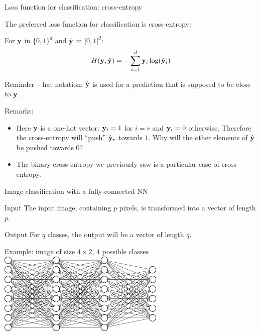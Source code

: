 \documentclass[xcolor=pdftex,dvipsnames,table,mathserif]{beamer}
\begin{document}
\begin{frame}{Loss function for classification: cross-entropy}

  The preferred loss function for classification is cross-entropy:

  \begin{block}{}
    For $\mathbf{y}$ in $\{0, 1\}^d$ and $\hat{\mathbf{y}}$ in $]0, 1[^d$:
        \[
        H(\mathbf{y}, \hat{\mathbf{y}}) = - \sum_{i=1}^d \mathbf{y}_i \log(\hat{\mathbf{y}}_i)
        \]

        \small
        Reminder -- hat notation: $\hat{\mathbf{y}}$ is used for a prediction that is supposed to be close to $\mathbf{y}$.
  \end{block}

  \pause

  Remarks:
\begin{itemize}
\item   Here $\mathbf{y}$ is a one-hot vector: $\mathbf{y}_i = 1$ for $i=r$ and $\mathbf{y}_i=0$ otherwise. Therefore the cross-entropy will ``push'' $\hat{\mathbf{y}}_r$ towards $1$. Why will the other elements of $\hat{\mathbf{y}}$ be pushed towards $0$?  \pause {}
  \pause
\item   The binary cross-entropy we previously saw is a particular case of cross-entropy.

\end{itemize}

\end{frame}

\begin{frame}{Image classification with a fully-connected NN}

  \begin{block}{Input}
    The input image, containing $p$ pixels, is transformed into a vector of length $p$.
  \end{block}

  \begin{block}{Output}
    For $q$ classes, the output will be a vector of length $q$.
  \end{block}

  \pause

  \begin{block}{Example: image of size $4 \times 2$, $4$ possible classes}
    \centering
    \includegraphics[width=0.6\textwidth]{mini_reseau3_bis}
  \end{block}

\end{frame}
\end{document}
